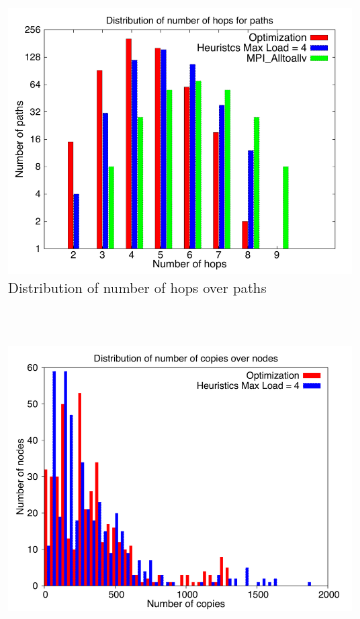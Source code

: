 \begin{figure}[!htbp]
        \centering
        \begin{subfigure}[b]{0.49\textwidth}
                \includegraphics[width=\textwidth]{report_figures/constantr/3_512/hop_histo.pdf}
                \caption{Distribution of number of hops over paths}
                \label{fig:3_512_hop}
        \end{subfigure}%
        ~ %
        \begin{subfigure}[b]{0.49\textwidth}
                \includegraphics[width=\textwidth]{report_figures/constantr/3_512/copy_histo.pdf}

\end{subfigure}
\end{figure}
